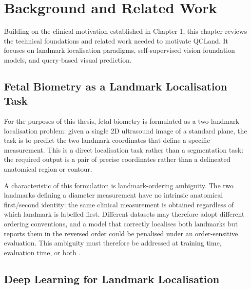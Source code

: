 \chapter{Background and Related Work}
\label{chap:background}

Building on the clinical motivation established in Chapter 1, this
chapter reviews the technical foundations and related work needed to
motivate QCLand. It focuses on landmark localisation paradigms,
self-supervised vision foundation models, and query-based visual
prediction.



\section{Fetal Biometry as a Landmark Localisation Task}
\label{sec:bg-task}

For the purposes of this thesis, fetal biometry is formulated as a
two-landmark localisation problem: given a single 2D ultrasound image
of a standard plane, the task is to predict the two landmark
coordinates that define a specific measurement. This is a direct
localisation task rather than a segmentation task: the required output
is a pair of precise coordinates rather than a delineated anatomical
region or contour.

A characteristic of this formulation is landmark-ordering ambiguity.
The two landmarks defining a diameter measurement have no intrinsic
anatomical first/second identity: the same clinical measurement is
obtained regardless of which landmark is labelled first. Different
datasets may therefore adopt different ordering conventions, and a
model that correctly localises both landmarks but reports them in the
reversed order could be penalised under an order-sensitive evaluation.
This ambiguity must therefore be addressed at training time,
evaluation time, or both \parencite{divece2025multicentre}.



\section{Deep Learning for Landmark Localisation}
\label{sec:bg-landmark-methods}

